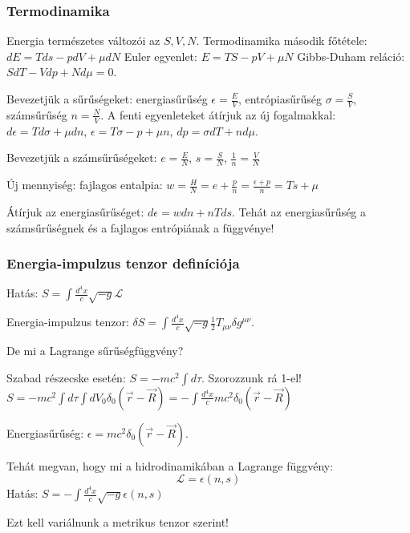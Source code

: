 \documentclass{beamer}
\begin{document}
\begin{frame}
\frametitle{Termodinamika}
Energia természetes változói az $S, V, N$. \newline
Termodinamika második főtétele: $dE=Tds-pdV+\mu dN$\newline
Euler egyenlet: $E=TS-pV+\mu N$\newline
Gibbs-Duham reláció: $SdT-Vdp+Nd\mu=0$.
\newline

Bevezetjük a sűrűségeket: energiasűrűség $\epsilon=\frac{E}{V}$, entrópiasűrűség $\sigma = \frac{S}{V}$, számsűrűség $n=\frac{N}{V}$. A fenti egyenleteket átírjuk az új fogalmakkal: $d\epsilon=Td\sigma +\mu dn$, $\epsilon=T\sigma-p+\mu n$, $dp=\sigma dT+nd\mu$.

Bevezetjük a számsűrűségeket: $e=\frac{E}{N}$, $s=\frac{S}{N}$, $\frac{1}{n}=\frac{V}{N}$\newline

Új mennyiség: fajlagos entalpia: $w=\frac{H}{N}=e+\frac{p}{n}=\frac{\epsilon+p}{n}=Ts+\mu$

Átírjuk az energiasűrűséget: $d\epsilon=wdn+nTds$. Tehát az energiasűrűség a számsűrűségnek és a fajlagos entrópiának a függvénye!
\end{frame}

\begin{frame}
\frametitle{Energia-impulzus tenzor definíciója}
Hatás: $S= \int \frac{d^4x}{c}\sqrt{-g}\mathcal{L}$

Energia-impulzus tenzor: $\delta S=\int \frac{d^4x}{c}\sqrt{-g}\frac{1}{2}T_{\mu\nu}\delta g^{\mu\nu}$.
\newline

De mi a Lagrange sűrűségfüggvény?

Szabad részecske esetén: $S=-mc^2\int d\tau$. Szorozzunk rá 1-el!
$S=-mc^2\int d\tau\int dV_0\delta_0(\vec{r}-\vec{R})=-\int \frac{d^4x}{c}mc^2\delta_0(\vec{r}-\vec{R})$

Energiasűrűség: $\epsilon=mc^2\delta_0(\vec{r}-\vec{R})$.

Tehát megvan, hogy mi a hidrodinamikában a Lagrange függvény: 
\begin{equation*}
\mathcal{L}=\epsilon(n,s)
\end{equation*}
Hatás: $S=-\int \frac{d^4x}{c} \sqrt{-g} \epsilon(n,s)$

Ezt kell variálnunk a metrikus tenzor szerint!
\end{frame}
\end{document}
